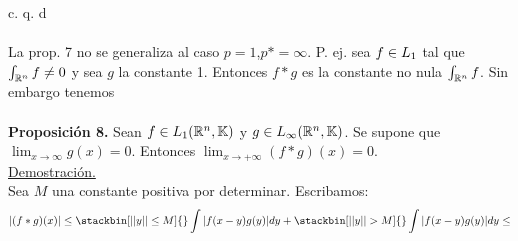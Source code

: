   \phantom{sssssssssssssssssssssssssssssssssss sasdasdasdasdadadssada} c. q. d \\ \\
  La prop. 7 no se generaliza al caso $p=1$,$p*=\infty$. P. ej. sea $f\in L_1$ tal que $\int_{\mathbb{R}^n}f\neq 0$ y sea $g$ la constante 1. Entonces $f*g$ es la constante no nula $\int_{\mathbb{R}^n}f$. Sin embargo tenemos \\ \\
  \textbf{Proposición 8.}
  Sean $f \in L_1 (\mathbb{R}^n,\mathbb{K})$ y $g\in L_{\infty}(\mathbb{R}^n,\mathbb{K})$. Se supone que $\lim_{x \to \infty}g(x)=0$. Entonces $\lim_{x \to +\infty}(f*g)(x)=0$. \\
  \underline{Demostración.} \\
  Sea $M$ una constante positiva por determinar. Escribamos: 
 \begin{equation}
 |(f*g)(x)| \leq  \stackbin[||y|| \leq M]{}\int{|f(x-y)g(y)|dy}+ \stackbin[||y|| >M]{}\int{|f(x-y)g(y)|dy} \leq 
 \end{equation}

